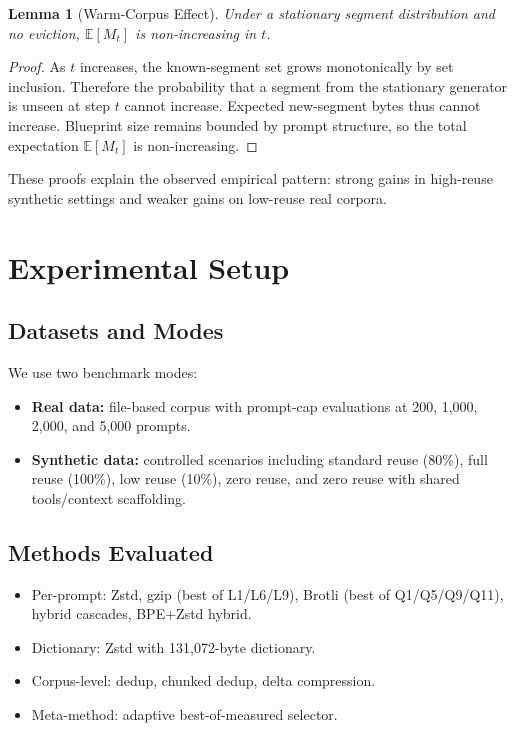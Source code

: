 \documentclass[10pt,conference]{IEEEtran}
\newtheorem{lemma}{Lemma}
\begin{document}
\begin{lemma}[Warm-Corpus Effect]
Under a stationary segment distribution and no eviction, $\mathbb{E}[M_t]$ is non-increasing in $t$.
\end{lemma}

\begin{proof}
As $t$ increases, the known-segment set grows monotonically by set inclusion. Therefore the probability that a segment from the stationary generator is unseen at step $t$ cannot increase. Expected new-segment bytes thus cannot increase. Blueprint size remains bounded by prompt structure, so the total expectation $\mathbb{E}[M_t]$ is non-increasing.
\end{proof}

These proofs explain the observed empirical pattern: strong gains in high-reuse synthetic settings and weaker gains on low-reuse real corpora.

\section{Experimental Setup}
\subsection{Datasets and Modes}
We use two benchmark modes:
\begin{itemize}
    \item \textbf{Real data:} file-based corpus with prompt-cap evaluations at 200, 1,000, 2,000, and 5,000 prompts.
    \item \textbf{Synthetic data:} controlled scenarios including standard reuse (80\%), full reuse (100\%), low reuse (10\%), zero reuse, and zero reuse with shared tools/context scaffolding.
\end{itemize}

\subsection{Methods Evaluated}
\begin{itemize}
    \item Per-prompt: Zstd, gzip (best of L1/L6/L9), Brotli (best of Q1/Q5/Q9/Q11), hybrid cascades, BPE+Zstd hybrid.
    \item Dictionary: Zstd with 131,072-byte dictionary.
    \item Corpus-level: dedup, chunked dedup, delta compression.
    \item Meta-method: adaptive best-of-measured selector.
\end{itemize}
\end{document}
